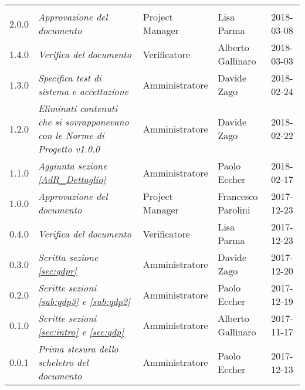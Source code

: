 \newpage 
\section*{}
\begin{table}[H]
	\centering
	\begin{tabular}{C{2cm}|C{4cm}|C{3cm}|C{3cm}|R{2cm}}
		
		 & & & & \\
		

		2.0.0 & \emph{Approvazione del documento} & Project Manager & Lisa Parma & 2018-03-08 \\
		\hline
		
		1.4.0 & \emph{Verifica del documento} & Verificatore &  Alberto Gallinaro & 2018-03-03\\
		\hline
		
		1.3.0 & \emph{Specifica test di sistema e accettazione} & Amministratore &  Davide Zago & 2018-02-24 \\
		\hline
		
		1.2.0 & \emph{Eliminati contenuti che si sovrapponevano con le Norme di Progetto v1.0.0} & Amministratore &  Davide Zago & 2018-02-22 \\
		\hline
		
		1.1.0 & \emph{Aggiunta sezione \ref{AdR_Dettaglio}} & Amministratore &  Paolo Eccher & 2018-02-17 \\
		\hline
		
		1.0.0 & \emph{Approvazione del documento} & Project Manager &  Francesco Parolini & 2017-12-23 \\
		\hline
		
		0.4.0  & \emph{Verifica del documento} & Verificatore & Lisa Parma & 2017-12-23 \\
		\hline
		
		0.3.0 & \emph{Scritta sezione \ref{sec:qdpr}} & Amministratore & Davide Zago & 2017-12-20 \\
		\hline
		
		0.2.0 & \emph{Scritte sezioni \ref{sub:qdp3} e \ref{sub:qdp2}} &  Amministratore & Paolo Eccher & 2017-12-19 \\
		\hline
		
		0.1.0 & \emph{Scritte sezioni \ref{sec:intro} e \ref{sec:qdp}} & Amministratore & Alberto Gallinaro & 2017-11-17 \\
		\hline
		
		0.0.1 & \emph{Prima stesura dello scheletro del documento} & Amministratore & Paolo Eccher &  2017-12-13 \\
		
	\end{tabular}
	
\end{table}


\clearpage